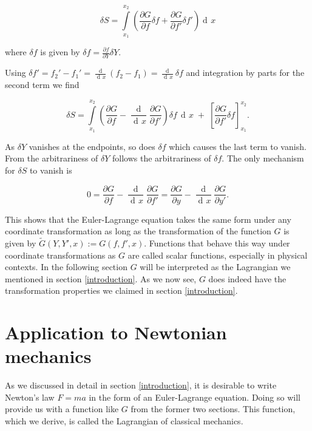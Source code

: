 \documentclass[prb,preprint]{revtex4-1}
\DeclareMathOperator{\dd}{d\!}
\DeclareMathOperator{\ddd}{\mathrm{d}}
\begin{document}
\begin{equation}
\delta S = \int\limits_{x_1}^{x_2} \left( \frac{\partial G}{\partial f} \delta f
+ \frac{\partial G}{\partial f'} \delta f' \right) \dd x
\end{equation}

where $\delta f$ is given by $\delta f = \frac{\partial f}{\partial Y} \delta Y$. 


Using $\delta f' = f_2' - f_1' = \frac{\ddd}{\dd x}(f_2 - f_1) = \frac{\dd}{\dd x} \delta f$ and integration by parts for the second term we find


\begin{equation}
\delta S = \int\limits_{x_1}^{x_2} \left( \frac{\partial G}{\partial f}
- \frac{\ddd}{\dd x} \frac{\partial G}{\partial f'} \right) \delta f \, \dd x \;
+ \; \left[\frac{\partial G}{\partial f'} \delta f \right]_{x_1}^{x_2}.
\end{equation}


As $\delta Y$ vanishes at the endpoints, so does $\delta f$ which causes the last term to vanish. From the arbitrariness of $\delta Y$ follows the arbitrariness of $\delta f$. The only mechanism for $\delta S$ to vanish is

\begin{equation}
0 = \frac{\partial G}{\partial f} - \frac{\ddd}{\dd x} \frac{\partial G}{\partial f'}
= \frac{\partial G}{\partial y} - \frac{\ddd}{\dd x} \frac{\partial G}{\partial y'}.
\end{equation}

This shows that the Euler-Lagrange equation takes the same form under any coordinate transformation as long as the transformation of the function $G$ is given by $\widetilde{G}(Y,Y',x) := G(f,f',x)$. Functions that behave this way under coordinate transformations as $G$ are called scalar functions, especially in physical contexts. 
In the following section $G$ will be interpreted as the Lagrangian we mentioned in section \ref{introduction}. As we now see, $G$ does indeed have the transformation properties we claimed in section \ref{introduction}.

\section{Application to Newtonian mechanics} \label{application}

As we discussed in detail in section \ref{introduction}, it is desirable to write Newton's law $F=ma$ in the form of an Euler-Lagrange equation. Doing so will provide us with a function like $G$ from the former two sections. This function, which we derive, is called the Lagrangian of classical mechanics.
\end{document}
